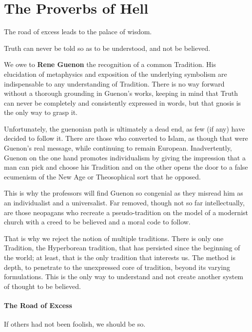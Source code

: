 \section{The Proverbs of Hell}

\begin{quotex}
The road of excess leads to the palace of wisdom.

Truth can never be told so as to be understood, and not be believed.
\end{quotex}


We owe to \textbf{Rene Guenon} the recognition of a common Tradition. His elucidation of metaphysics and exposition of the underlying symbolism are indispensable to any understanding of Tradition. There is no way forward without a thorough grounding in Guenon's works, keeping in mind that Truth can never be completely and consistently expressed in words, but that gnosis is the only way to grasp it.

Unfortunately, the guenonian path is ultimately a dead end, as few (if any) have decided to follow it. There are those who converted to Islam, as though that were Guenon's real message, while continuing to remain European. Inadvertently, Guenon on the one hand promotes individualism by giving the impression that a man can pick and choose his Tradition and on the other opens the door to a false ecumenism of the New Age or Theosophical sort that he opposed.

This is why the professors will find Guenon so congenial as they misread him as an individualist and a universalist. Far removed, though not so far intellectually, are those neopagans who recreate a pseudo-tradition on the model of a modernist church with a creed to be believed and a moral code to follow.

That is why we reject the notion of multiple traditions. There is only one Tradition, the Hyperborean tradition, that has persisted since the beginning of the world; at least, that is the only tradition that interests us. The method is depth, to penetrate to the unexpressed core of tradition, beyond its varying formulations. This is the only way to understand and not create another system of thought to be believed.

\paragraph{The Road of Excess}


\begin{quotex}
If others had not been foolish, we should be so.
\end{quotex}

